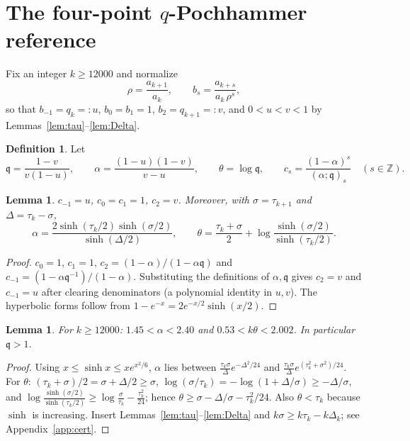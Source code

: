 \documentclass[11pt,a4paper]{article}
\numberwithin{equation}{section}
\newtheorem{lemma}[theorem]{Lemma}
\theoremstyle{definition}
\newtheorem{definition}[theorem]{Definition}
\theoremstyle{remark}
\newcommand{\qq}{\mathfrak q}
\begin{document}
\section{The four-point \texorpdfstring{$q$}{q}-Pochhammer reference}\label{sec:reference}

Fix an integer $k\ge12000$ and normalize
\[
\rho=\frac{a_{k+1}}{a_k},\qquad b_s=\frac{a_{k+s}}{a_k\,\rho^s},
\]
so that $b_{-1}=q_k=:u$, $b_0=b_1=1$, $b_2=q_{k+1}=:v$, and $0<u<v<1$ by Lemmas~\ref{lem:tau}--\ref{lem:Delta}.

\begin{definition}
Let
\[
\qq=\frac{1-v}{v(1-u)},\qquad \alpha=\frac{(1-u)(1-v)}{v-u},\qquad \theta=\log\qq,\qquad
c_s=\frac{(1-\alpha)^s}{(\alpha;\qq)_s}\quad(s\in\mathbb Z).
\]
\end{definition}

\begin{lemma}\label{lem:match}
$c_{-1}=u$, $c_0=c_1=1$, $c_2=v$. Moreover, with $\sigma=\tau_{k+1}$ and $\Delta=\tau_k-\sigma$,
\[
\alpha=\frac{2\sinh(\tau_k/2)\sinh(\sigma/2)}{\sinh(\Delta/2)},\qquad
\theta=\frac{\tau_k+\sigma}{2}+\log\frac{\sinh(\sigma/2)}{\sinh(\tau_k/2)} .
\]
\end{lemma}

\begin{proof}
$c_0=1$, $c_1=1$, $c_2=(1-\alpha)/(1-\alpha\qq)$ and $c_{-1}=(1-\alpha\qq^{-1})/(1-\alpha)$. Substituting the
definitions of $\alpha,\qq$ gives $c_2=v$ and $c_{-1}=u$ after clearing denominators (a polynomial identity in
$u,v$). The hyperbolic forms follow from $1-e^{-x}=2e^{-x/2}\sinh(x/2)$.
\end{proof}

\begin{lemma}\label{lem:params}
For $k\ge12000$: $1.45<\alpha<2.40$ and $0.53<k\theta<2.002$. In particular $\qq>1$.
\end{lemma}

\begin{proof}
Using $x\le\sinh x\le xe^{x^2/6}$,
$\alpha$ lies between $\frac{\tau_k\sigma}{\Delta}e^{-\Delta^2/24}$ and $\frac{\tau_k\sigma}{\Delta}e^{(\tau_k^2+\sigma^2)/24}$.
For $\theta$: $(\tau_k+\sigma)/2=\sigma+\Delta/2\ge\sigma$, $\log(\sigma/\tau_k)=-\log(1+\Delta/\sigma)\ge-\Delta/\sigma$,
and $\log\frac{\sinh(\sigma/2)}{\sinh(\tau_k/2)}\ge\log\frac{\sigma}{\tau_k}-\frac{\tau_k^2}{24}$; hence
$\theta\ge\sigma-\Delta/\sigma-\tau_k^2/24$. Also $\theta<\tau_k$ because $\sinh$ is increasing. Insert
Lemmas~\ref{lem:tau}--\ref{lem:Delta} and $k\sigma\ge k\tau_k-k\Delta_k$; see Appendix~\ref{app:cert}.
\end{proof}
\end{document}
